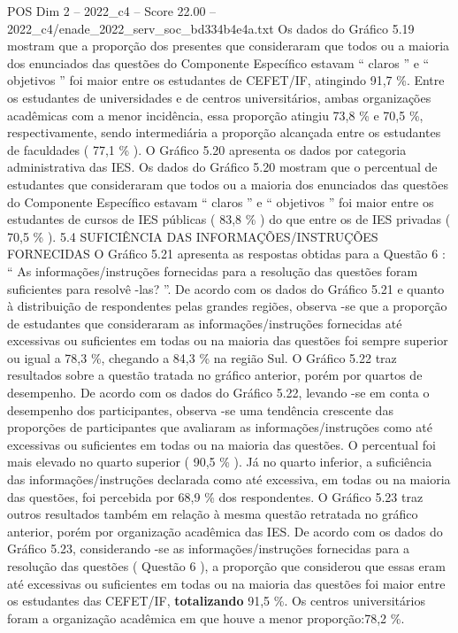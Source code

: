 \begin{textsample}{POS Dim 2 – 2022\_c4 – Score 22.00 – 2022\_c4/enade\_2022\_serv\_soc\_bd334b4e4a.txt}
Os dados do Gráfico 5.19 mostram que a proporção dos presentes que consideraram que todos ou a maioria dos enunciados das questões do Componente Específico estavam “ claros ” e “ objetivos ” foi maior entre os estudantes de CEFET/IF, atingindo 91,7 \%.
Entre os estudantes de universidades e de centros universitários, ambas organizações acadêmicas com a menor incidência, essa proporção atingiu 73,8 \% e 70,5 \%, respectivamente, sendo intermediária a proporção alcançada entre os estudantes de faculdades ( 77,1 \% ).
O Gráfico 5.20 apresenta os dados por categoria administrativa das IES.
Os dados do Gráfico 5.20 mostram que o percentual de estudantes que consideraram que todos ou a maioria dos enunciados das questões do Componente Específico estavam “ claros ” e “ objetivos ” foi maior entre os estudantes de cursos de IES públicas ( 83,8 \% ) do que entre os de IES privadas ( 70,5 \% ). 5.4 SUFICIÊNCIA DAS INFORMAÇÕES/INSTRUÇÕES FORNECIDAS O Gráfico 5.21 apresenta as respostas obtidas para a Questão 6 : “ As informações/instruções fornecidas para a resolução das questões foram suficientes para resolvê -las? ”.
De acordo com os dados do Gráfico 5.21 e quanto à distribuição de respondentes pelas grandes regiões, observa -se que a proporção de estudantes que consideraram as informações/instruções fornecidas até excessivas ou suficientes em todas ou na maioria das questões foi sempre superior ou igual a 78,3 \%, chegando a 84,3 \% na região Sul.
O Gráfico 5.22 traz resultados sobre a questão tratada no gráfico anterior, porém por quartos de desempenho.
De acordo com os dados do Gráfico 5.22, levando -se em conta o desempenho dos participantes, observa -se uma tendência crescente das proporções de participantes que avaliaram as informações/instruções como até excessivas ou suficientes em todas ou na maioria das questões.
O percentual foi mais elevado no quarto superior ( 90,5 \% ).
Já no quarto inferior, a suficiência das informações/instruções declarada como até excessiva, em todas ou na maioria das questões, foi percebida por 68,9 \% dos respondentes.
O Gráfico 5.23 traz outros resultados também em relação à mesma questão retratada no gráfico anterior, porém por organização acadêmica das IES.
De acordo com os dados do Gráfico 5.23, considerando -se as informações/instruções fornecidas para a resolução das questões ( Questão 6 ), a proporção que considerou que essas eram até excessivas ou suficientes em todas ou na maioria das questões foi maior entre os estudantes das CEFET/IF, \textbf{totalizando} 91,5 \%.
Os centros universitários foram a organização acadêmica em que houve a menor proporção:78,2 \%.

\end{textsample}
